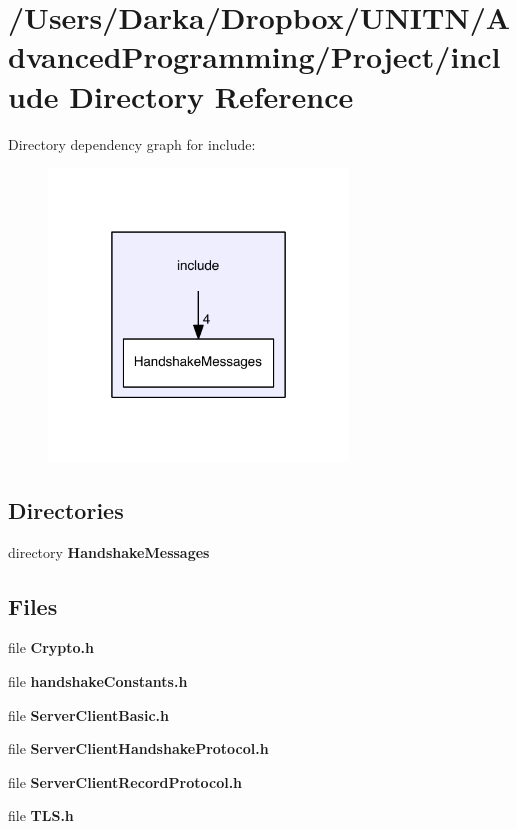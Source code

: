 \section{/\+Users/\+Darka/\+Dropbox/\+U\+N\+I\+T\+N/\+Advanced\+Programming/\+Project/include Directory Reference}
\label{dir_d44c64559bbebec7f509842c48db8b23}
Directory dependency graph for include\+:\nopagebreak
\begin{figure}[H]
\begin{center}
\leavevmode
\includegraphics[width=226pt]{dir_d44c64559bbebec7f509842c48db8b23_dep}
\end{center}
\end{figure}
\subsection*{Directories}
\begin{DoxyCompactItemize}
\item 
directory {\bf Handshake\+Messages}
\end{DoxyCompactItemize}
\subsection*{Files}
\begin{DoxyCompactItemize}
\item 
file {\bf Crypto.\+h}
\item 
file {\bf handshake\+Constants.\+h}
\item 
file {\bf Server\+Client\+Basic.\+h}
\item 
file {\bf Server\+Client\+Handshake\+Protocol.\+h}
\item 
file {\bf Server\+Client\+Record\+Protocol.\+h}
\item 
file {\bf T\+L\+S.\+h}
\end{DoxyCompactItemize}
